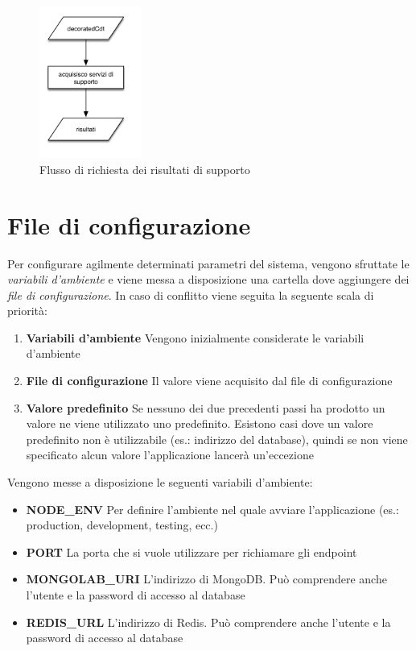 \begin{figure}[ht]
	\centering
	\includegraphics[width=0.3\textwidth]{5-implementazione-backend/Immagini/diagramma_flusso_servizi_supporto.png}
	\caption{Flusso di richiesta dei risultati di supporto\label{fig:flusso-servizi-supporto}}
\end{figure}

\section{File di configurazione\label{sec:file-configurazione}}

Per configurare agilmente determinati parametri del sistema, vengono sfruttate le \emph{variabili d'ambiente} e viene messa a disposizione una cartella dove aggiungere dei \emph{file di configurazione}. In caso di conflitto viene seguita la seguente scala di priorità:

\begin{enumerate}
	\item \textbf{Variabili d'ambiente}
	Vengono inizialmente considerate le variabili d'ambiente
	\item \textbf{File di configurazione}
	Il valore viene acquisito dal file di configurazione
	\item \textbf{Valore predefinito}
	Se nessuno dei due precedenti passi ha prodotto un valore ne viene utilizzato uno predefinito. Esistono casi dove un valore predefinito non è utilizzabile (es.: indirizzo del database), quindi se non viene specificato alcun valore l'applicazione lancerà un'eccezione
\end{enumerate}

Vengono messe a disposizione le seguenti variabili d'ambiente:

\begin{itemize}
	\item \textbf{NODE\_ENV}
	Per definire l'ambiente nel quale avviare l'applicazione (es.: production, development, testing, ecc.)
	\item \textbf{PORT}
	La porta che si vuole utilizzare per richiamare gli endpoint
	\item \textbf{MONGOLAB\_URI}
	L'indirizzo di MongoDB. Può comprendere anche l'utente e la password di accesso al database
	\item \textbf{REDIS\_URL}
	L'indirizzo di Redis. Può comprendere anche l'utente e la password di accesso al database
\end{itemize}

